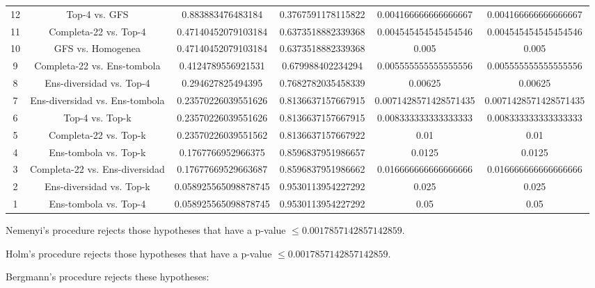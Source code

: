 \documentclass[a4paper,10pt]{article}
\begin{document}
\begin{landscape}
\begin{table}[!htp]
\begin{tabular}{cccccc}
12&Top-4 vs. GFS&0.883883476483184&0.3767591178115822&0.004166666666666667&0.004166666666666667\\
11&Completa-22 vs. Top-4&0.47140452079103184&0.6373518882339368&0.004545454545454546&0.004545454545454546\\
10&GFS vs. Homogenea&0.47140452079103184&0.6373518882339368&0.005&0.005\\
9&Completa-22 vs. Ens-tombola&0.4124789556921531&0.679988402234294&0.005555555555555556&0.005555555555555556\\
8&Ens-diversidad vs. Top-4&0.294627825494395&0.7682782035458339&0.00625&0.00625\\
7&Ens-diversidad vs. Ens-tombola&0.23570226039551626&0.8136637157667915&0.0071428571428571435&0.0071428571428571435\\
6&Top-4 vs. Top-k&0.23570226039551626&0.8136637157667915&0.008333333333333333&0.008333333333333333\\
5&Completa-22 vs. Top-k&0.23570226039551562&0.8136637157667922&0.01&0.01\\
4&Ens-tombola vs. Top-k&0.1767766952966375&0.8596837951986657&0.0125&0.0125\\
3&Completa-22 vs. Ens-diversidad&0.17677669529663687&0.8596837951986662&0.016666666666666666&0.016666666666666666\\
2&Ens-diversidad vs. Top-k&0.058925565098878745&0.9530113954227292&0.025&0.025\\
1&Ens-tombola vs. Top-4&0.058925565098878745&0.9530113954227292&0.05&0.05\\
\hline
\end{tabular}
\end{table}
Nemenyi's procedure rejects those hypotheses that have a p-value $\le0.0017857142857142859$.


Holm's procedure rejects those hypotheses that have a p-value $\le0.0017857142857142859$.


Bergmann's procedure rejects these hypotheses:


\begin{itemize}


\end{itemize}



\end{landscape}
\end{document}

